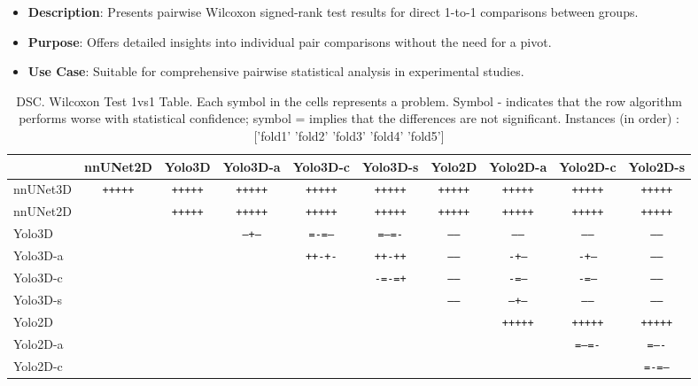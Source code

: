 \documentclass[11pt]{article}
\providecommand{\tightlist}{%
      \setlength{\itemsep}{0pt}\setlength{\parskip}{0pt}}
\begin{document}
\begin{itemize}
  \tightlist
  \item
    \textbf{Description}: Presents pairwise Wilcoxon signed-rank test
    results for direct 1-to-1 comparisons between groups.\\
  \item
    \textbf{Purpose}: Offers detailed insights into individual pair
    comparisons without the need for a pivot.\\
  \item
    \textbf{Use Case}: Suitable for comprehensive pairwise statistical
    analysis in experimental studies.
  \end{itemize}
\begin{table}[H]
        \caption{DSC.  Wilcoxon Test 1vs1 Table. Each symbol in the cells represents a problem. Symbol - indicates that the row algorithm performs worse with statistical confidence;  symbol = implies that the differences are not significant. Instances (in order) : ['fold1' 'fold2' 'fold3' 'fold4' 'fold5']
}
        \vspace{1mm}
        \centering
        \begin{scriptsize}
        \begin{tabular}{l|c|c|c|c|c|c|c|c|c}
        \hline
        & nnUNet2D & Yolo3D & Yolo3D-a & Yolo3D-c & Yolo3D-s & Yolo2D & Yolo2D-a & Yolo2D-c & Yolo2D-s \\ \hline
nnUNet3D & \texttt{+++++} & \texttt{+++++} & \texttt{+++++} & \texttt{+++++} & \texttt{+++++} & \texttt{+++++} & \texttt{+++++} & \texttt{+++++} & \texttt{+++++} \\
nnUNet2D &  & \texttt{+++++} & \texttt{+++++} & \texttt{+++++} & \texttt{+++++} & \texttt{+++++} & \texttt{+++++} & \texttt{+++++} & \texttt{+++++} \\
Yolo3D & \texttt{} &  & \texttt{--+--} & \texttt{=-=--} & \texttt{=--=-} & \texttt{-----} & \texttt{-----} & \texttt{-----} & \texttt{-----} \\
Yolo3D-a & \texttt{} & \texttt{} &  & \texttt{++-+-} & \texttt{++-++} & \texttt{-----} & \texttt{-+---} & \texttt{-+---} & \texttt{-----} \\
Yolo3D-c & \texttt{} & \texttt{} & \texttt{} &  & \texttt{-=-=+} & \texttt{-----} & \texttt{-=---} & \texttt{-=---} & \texttt{-----} \\
Yolo3D-s & \texttt{} & \texttt{} & \texttt{} & \texttt{} &  & \texttt{-----} & \texttt{--+--} & \texttt{-----} & \texttt{-----} \\
Yolo2D & \texttt{} & \texttt{} & \texttt{} & \texttt{} & \texttt{} &  & \texttt{+++++} & \texttt{+++++} & \texttt{+++++} \\
Yolo2D-a & \texttt{} & \texttt{} & \texttt{} & \texttt{} & \texttt{} & \texttt{} &  & \texttt{=--=-} & \texttt{=----} \\
Yolo2D-c & \texttt{} & \texttt{} & \texttt{} & \texttt{} & \texttt{} & \texttt{} & \texttt{} &  & \texttt{=-=--} \\

        \end{tabular}
        \end{scriptsize}
        \end{table}
\end{document}
